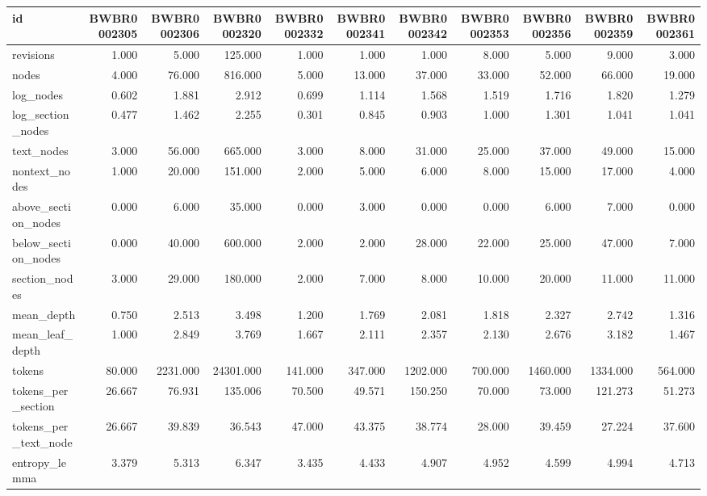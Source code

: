 \begin{tabular}{lrrrrrrrrrr}
\toprule
id & BWBR0002305 & BWBR0002306 & BWBR0002320 & BWBR0002332 & BWBR0002341 & BWBR0002342 & BWBR0002353 & BWBR0002356 & BWBR0002359 & BWBR0002361 \\
\midrule
revisions & 1.000 & 5.000 & 125.000 & 1.000 & 1.000 & 1.000 & 8.000 & 5.000 & 9.000 & 3.000 \\
\cline{1-11}
nodes & 4.000 & 76.000 & 816.000 & 5.000 & 13.000 & 37.000 & 33.000 & 52.000 & 66.000 & 19.000 \\
\cline{1-11}
log\_nodes & 0.602 & 1.881 & 2.912 & 0.699 & 1.114 & 1.568 & 1.519 & 1.716 & 1.820 & 1.279 \\
\cline{1-11}
log\_section\_nodes & 0.477 & 1.462 & 2.255 & 0.301 & 0.845 & 0.903 & 1.000 & 1.301 & 1.041 & 1.041 \\
\cline{1-11}
text\_nodes & 3.000 & 56.000 & 665.000 & 3.000 & 8.000 & 31.000 & 25.000 & 37.000 & 49.000 & 15.000 \\
\cline{1-11}
nontext\_nodes & 1.000 & 20.000 & 151.000 & 2.000 & 5.000 & 6.000 & 8.000 & 15.000 & 17.000 & 4.000 \\
\cline{1-11}
above\_section\_nodes & 0.000 & 6.000 & 35.000 & 0.000 & 3.000 & 0.000 & 0.000 & 6.000 & 7.000 & 0.000 \\
\cline{1-11}
below\_section\_nodes & 0.000 & 40.000 & 600.000 & 2.000 & 2.000 & 28.000 & 22.000 & 25.000 & 47.000 & 7.000 \\
\cline{1-11}
section\_nodes & 3.000 & 29.000 & 180.000 & 2.000 & 7.000 & 8.000 & 10.000 & 20.000 & 11.000 & 11.000 \\
\cline{1-11}
mean\_depth & 0.750 & 2.513 & 3.498 & 1.200 & 1.769 & 2.081 & 1.818 & 2.327 & 2.742 & 1.316 \\
\cline{1-11}
mean\_leaf\_depth & 1.000 & 2.849 & 3.769 & 1.667 & 2.111 & 2.357 & 2.130 & 2.676 & 3.182 & 1.467 \\
\cline{1-11}
tokens & 80.000 & 2231.000 & 24301.000 & 141.000 & 347.000 & 1202.000 & 700.000 & 1460.000 & 1334.000 & 564.000 \\
\cline{1-11}
tokens\_per\_section & 26.667 & 76.931 & 135.006 & 70.500 & 49.571 & 150.250 & 70.000 & 73.000 & 121.273 & 51.273 \\
\cline{1-11}
tokens\_per\_text\_node & 26.667 & 39.839 & 36.543 & 47.000 & 43.375 & 38.774 & 28.000 & 39.459 & 27.224 & 37.600 \\
\cline{1-11}
entropy\_lemma & 3.379 & 5.313 & 6.347 & 3.435 & 4.433 & 4.907 & 4.952 & 4.599 & 4.994 & 4.713 \\

\end{tabular}

